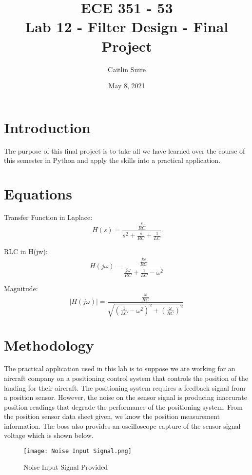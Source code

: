 \documentclass[12pt]{report}
\title{\myfont \textbf{ ECE 351 - 53 \\ \bigskip Lab 12 - Filter Design - Final Project}}
\author{Caitlin Suire}
\date{May 8, 2021}
\begin{document}
\maketitle

\thispagestyle{empty}

\newpage

\tableofcontents
\pagebreak


\section{Introduction}
The purpose of this final project is to take all we have learned over the course of this semester in Python and apply the skills into a practical application. 

\section{Equations}
Transfer Function in Laplace:
\[H(s) = \frac{ \frac{s}{RC} }{ s^2 + \frac{s}{RC}  +  \frac{1}{LC}  }\] 

\noindent RLC in H(jw): 
\[H(j\omega) = \frac{ \frac{j\omega}{RC} }{ \frac{j\omega}{RC} + \frac{1}{LC} - \omega^2}\] 

\noindent Magnitude:
\[ |H(j\omega)| = \frac{ \frac{\omega}{RC} }{ \sqrt{(\frac{1}{LC} - \omega^2)^2 + (\frac{\omega}{RC})^2  } } \] 

\section{Methodology}
The practical application used in this lab is to suppose we are working for an aircraft company on a positioning control system that controls the position of the landing for their aircraft. The positioning system requires a feedback signal from a position sensor. However, the noise on the sensor signal is producing inaccurate position readings that degrade the performance of the positioning system. From the position sensor data sheet given, we know the position measurement information. The boss also provides an oscilloscope capture of the sensor signal voltage which is shown below.\\

\newpage 

\begin{figure}[ht]
\begin{center}
\texttt{[image: Noise Input Signal.png]}
\caption{Noise Input Signal Provided}
\end{center}
\end{figure}
\end{document}

